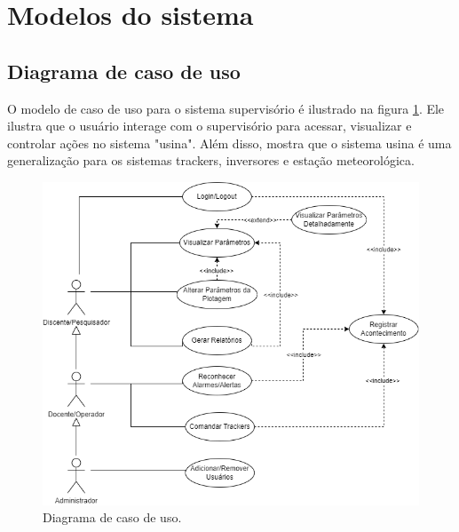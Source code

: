\documentclass[a4paper,12pt]{article}
\begin{document}
\section {Modelos do sistema}
\subsection{Diagrama de caso de uso}

O modelo de caso de uso para o sistema supervisório é ilustrado na figura \ref{fig: caso de uso}. Ele ilustra que o usuário interage com o supervisório para acessar, visualizar e controlar ações no sistema "usina". Além disso, mostra que o sistema usina é uma generalização para os sistemas trackers, inversores e estação meteorológica.
\begin{figure} [htbp]
    \centering
    \includegraphics[width=15cm]{Imagem/Diagrama _caso_uso.png}
    \caption{Diagrama de caso de uso.}
    \label{fig: caso de uso}
\end{figure}
\end{document}
